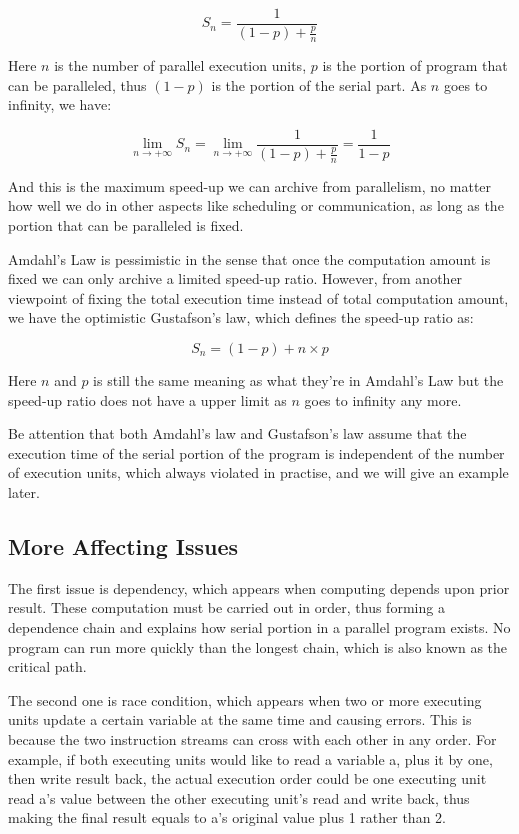 \documentclass[12pt,a4]{report}
\begin{document}
$$ S_n = \frac{1}{(1 - p) + \frac{p}{n}} $$

Here $n$ is the number of parallel execution units, $p$ is the portion of program that can be paralleled, thus $(1-p)$ is the portion of the serial part. As $n$ goes to infinity, we have:

$$ \lim_{n \to +\infty} S_n = \lim_{n \to +\infty} \frac{1}{(1 - p) + \frac{p}{n}} = \frac{1}{1 - p} $$

And this is the maximum speed-up we can archive from parallelism, no matter how well we do in other aspects like scheduling or communication, as long as the portion that can be paralleled is fixed.

Amdahl's Law is pessimistic in the sense that once the computation amount is fixed we can only archive a limited speed-up ratio. However, from another viewpoint of fixing the total execution time instead of total computation amount, we have the optimistic Gustafson's law, which defines the speed-up ratio as:

$$ S_n = (1 - p) + n \times p $$

Here $n$ and $p$ is still the same meaning as what they're in Amdahl's Law but the speed-up ratio does not have a upper limit as $n$ goes to infinity any more.

Be attention that both Amdahl's law and Gustafson's law assume that the execution time of the serial portion of the program is independent of the number of execution units, which always violated in practise, and we will give an example later.

\subsection{More Affecting Issues}

The first issue is dependency, which appears when computing depends upon prior result. These computation must be carried out in order, thus forming a dependence chain and explains how serial portion in a parallel program exists. No program can run more quickly than the longest chain, which is also known as the critical path.

The second one is race condition, which appears when two or more executing units update a certain variable at the same time and causing errors. This is because the two instruction streams can cross with each other in any order. For example, if both executing units would like to read a variable a, plus it by one, then write result back, the actual execution order could be one executing unit read a's value between the other executing unit's read and write back, thus making the final result equals to a's original value plus 1 rather than 2.
\end{document}
